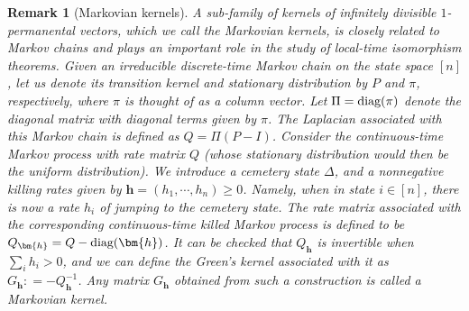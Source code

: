 \documentclass[a4paper, 11pt]{article}
\newcommand{\diag}{\textnormal{diag}}
\newtheorem{rem}{Remark}[thm]
\begin{document}
\vspace{.3em} \begin{rem}[Markovian kernels]
\label{rem:rem2-lem:density}
A sub-family of
kernels of infinitely divisible $1$-permanental vectors, which we call the Markovian kernels, is closely related to Markov chains and plays an important role in the study of local-time isomorphism theorems. Given an irreducible discrete-time Markov chain on the state space $[n]$, let us denote its transition kernel and stationary distribution by $P$ and $\pi$, respectively, where $\pi$ is thought of as a column vector. Let $\Pi=\diag(\pi)$ denote the diagonal matrix with diagonal terms given by $\pi$. The Laplacian associated with this Markov chain is defined as $Q=\Pi(P-I)$. Consider the continuous-time Markov process with rate matrix $Q$ (whose stationary distribution would then be the uniform distribution). We introduce a cemetery state $\Delta$, and a nonnegative killing rates given by $\bm{h}=(h_1, \cdots, h_n)\geq 0$.
Namely, when in state $i \in [n]$, there is now a rate $h_i$ of jumping to the cemetery state. The
rate matrix associated with
the corresponding continuous-time killed Markov process is defined to be $Q_{\bm{h}}=Q-\diag(\bm{h})$. It can be checked that $Q_{\bm{h}}$ is invertible when $\sum_i h_i > 0$, and we can define the Green's kernel associated with it as $G_{\bm{h}} : =-Q_{\bm{h}}^{-1}$. Any
matrix $G_{\bm{h}}$ obtained from such a construction is called a Markovian kernel.


\end{rem}
\end{document}
